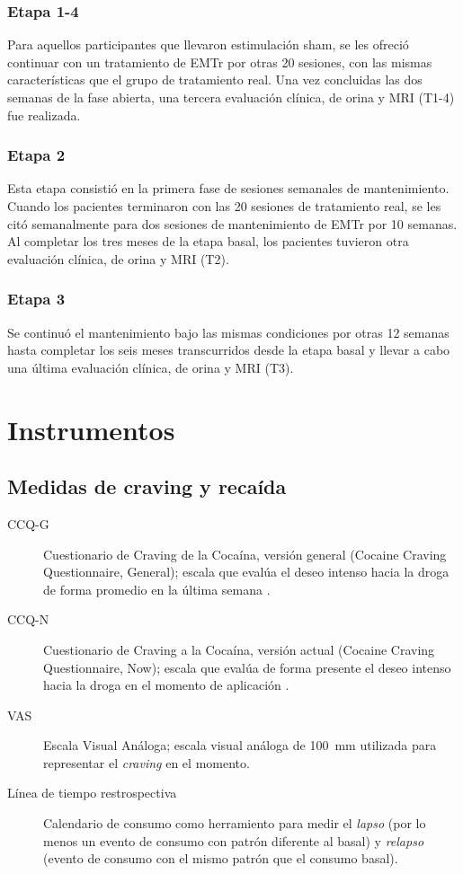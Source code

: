 \subsubsection{Etapa 1-4}
Para aquellos participantes que llevaron estimulación sham, se les ofreció continuar con un tratamiento de EMTr por otras 20 sesiones, con las mismas características que el grupo de tratamiento real. Una vez concluidas las dos semanas de la fase abierta, una tercera evaluación clínica, de orina y MRI (T1-4) fue realizada.

\subsubsection{Etapa 2}
Esta etapa consistió en la primera fase de sesiones semanales de mantenimiento. Cuando los pacientes terminaron con las 20 sesiones de tratamiento real, se les citó semanalmente para dos sesiones de mantenimiento de EMTr por 10 semanas. Al completar los tres meses de la etapa basal, los pacientes tuvieron otra evaluación clínica, de orina y MRI (T2).

\subsubsection{Etapa 3}
Se continuó el mantenimiento bajo las mismas condiciones por otras 12 semanas hasta completar los seis meses transcurridos desde la etapa basal y llevar a cabo una última evaluación clínica, de orina y MRI (T3).

\section{Instrumentos}
\subsection{Medidas de craving y recaída}
\begin{description}
    \item[CCQ-G] Cuestionario de Craving de la Cocaína, versión general (Cocaine Craving Questionnaire, General); escala que evalúa el deseo intenso hacia la droga de forma promedio en la última semana \parencite{Tiffany1993}.
    \item[CCQ-N] Cuestionario de Craving a la Cocaína, versión actual (Cocaine Craving Questionnaire, Now); escala que evalúa de forma presente el deseo intenso hacia la droga en el momento de aplicación \parencite{Tiffany1993}.
    \item[VAS] Escala Visual Análoga; escala visual análoga de \SI{100}{\milli\meter} utilizada para representar el \textit{craving} en el momento.
    \item[Línea de tiempo restrospectiva] Calendario de consumo como herramiento para medir el \emph{lapso} (por lo menos un evento de consumo con patrón diferente al basal) y \emph{relapso} (evento de consumo con el mismo patrón que el consumo basal).
\end{description}
